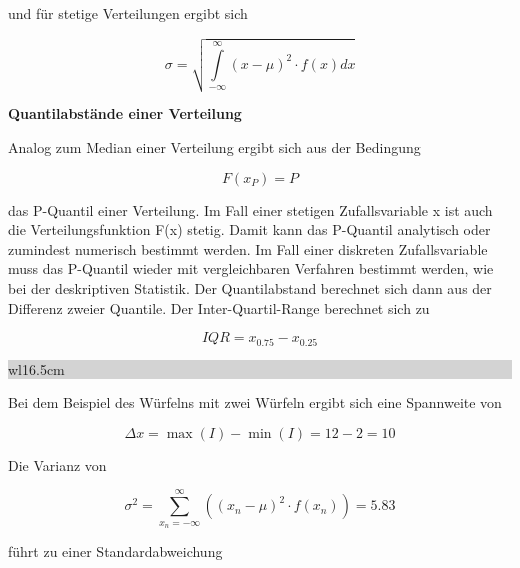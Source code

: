 \noindent und f\"{u}r stetige Verteilungen ergibt sich 

\begin{equation}\label{eq:fourfiftyseven}
\sigma =\sqrt{\int\limits _{-\infty }^{\infty }\left(x-\mu \right)^{2} \cdot f(x) dx}
\end{equation}

{\selectfont
\noindent\textbf{Quantilabst\"{a}nde einer Verteilung}}\smallskip

\noindent Analog zum Median einer Verteilung ergibt sich aus der Bedingung

\begin{equation}\label{eq:fourfiftyeight}
F(x_{P})=P
\end{equation}

\noindent das P-Quantil einer Verteilung. Im Fall einer stetigen Zufallsvariable x ist auch die Verteilungsfunktion F(x) stetig. Damit kann das P-Quantil analytisch oder zumindest numerisch bestimmt werden. Im Fall einer diskreten Zufallsvariable muss das P-Quantil wieder mit vergleichbaren Verfahren bestimmt werden, wie bei der deskriptiven Statistik. Der Quantilabstand berechnet sich dann aus der Differenz zweier Quantile. Der Inter-Quartil-Range berechnet sich zu

\begin{equation}\label{eq:fourfiftynine}
IQR=x_{0.75} -x_{0.25}
\end{equation}

\noindent
\colorbox{lightgray}{%
%
\renewcommand\arraystretch{0.6}%
\begin{tabular}{ wl{16.5cm} }
{}
\end{tabular}%
}\medskip 

\noindent Bei dem Beispiel des W\"{u}rfelns mit zwei W\"{u}rfeln ergibt sich eine Spannweite von 

\begin{equation}\label{eq:foursixty}
\Delta x=\max (I)-\min (I)=12-2=10
\end{equation}

\noindent Die Varianz von

\begin{equation}\label{eq:foursixtyone}
\sigma ^{2} =\sum _{x_{n} =-\infty }^{\infty }\left(\left(x_{n} -\mu \right)^{2} \cdot f(x_{n} )\right) =5.83
\end{equation}

\noindent f\"{u}hrt zu einer Standardabweichung

